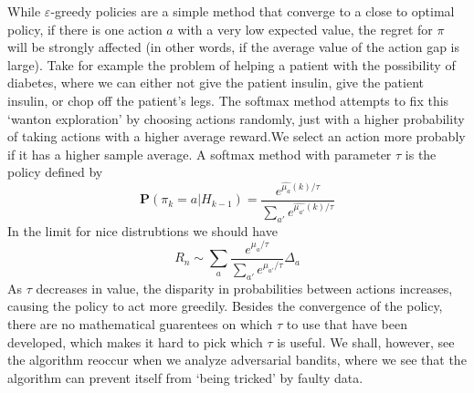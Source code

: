 While $\varepsilon$-greedy policies are a simple method that converge to a close to optimal policy, if there is one action $a$ with a very low expected value, the regret for $\pi$ will be strongly affected (in other words, if the average value of the action gap is large). Take for example the problem of helping a patient with the possibility of diabetes, where we can either not give the patient insulin, give the patient insulin, or chop off the patient's legs. The softmax method attempts to fix this `wanton exploration' by choosing actions randomly, just with a higher probability of taking actions with a higher average reward.We select an action more probably if it has a higher sample average. A softmax method with parameter $\tau$ is the policy defined by
%
\[ \mathbf{P}(\pi_k = a | H_{k-1}) = \frac{e^{\widehat{\mu_a}(k)/\tau}}{\sum_{a'} e^{\widehat{\mu_{a'}}(k)/\tau}}\]
% 
In the limit for nice distrubtions we should have
%
\[ R_n \sim \sum_a \frac{e^{\mu_a/\tau}}{\sum_{a'} e^{\mu_{a'}/\tau}} \Delta_a \]
%
As $\tau$ decreases in value, the disparity in probabilities between actions increases, causing the policy to act more greedily. Besides the convergence of the policy, there are no mathematical guarentees on which $\tau$ to use that have been developed, which makes it hard to pick which $\tau$ is useful. We shall, however, see the algorithm reoccur when we analyze adversarial bandits, where we see that the algorithm can prevent itself from `being tricked' by faulty data.